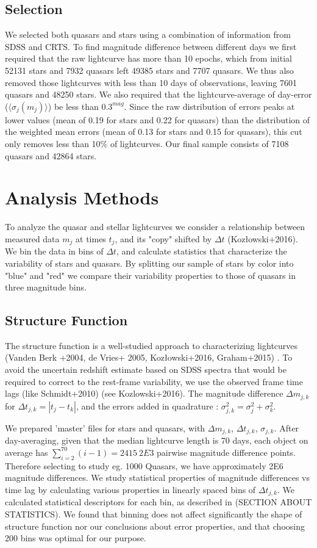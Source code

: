 \documentclass[fleqn,usenatbib]{mnras}  %
\begin{document}
\subsection{Selection}
We selected both quasars and stars using a combination of information from SDSS and CRTS. To find magnitude difference between different days we first required that the raw lightcurve has more than 10 epochs, which from initial 52131 stars and 7932 quasars left 49385 stars and 7707 quasars. We thus also removed those lightcurves with less than 10 days of observations, leaving 7601 quasars and 48250 stars.  We also required that the lightcurve-average of day-error ($\langle \sigma_{j}(m_{j}) \rangle$) be less than $0.3^{mag}$. Since the raw distribution of errors   peaks at lower values (mean of 0.19 for stars and 0.22 for quasars) than the distribution of the weighted mean errors (mean of 0.13 for stars and 0.15 for quasars), this cut only removes less than 10\% of lightcurves. Our final sample consists of 7108 quasars and 42864 stars.

\section{Analysis Methods}
To analyze the quasar and stellar lightcurves we consider a relationship between measured data $m_{j}$  at times $t_{j}$, and its "copy" shifted by $\Delta  t$ (Koz\l{}owski+2016). We bin the data in bins of $\Delta t$, and calculate statistics that characterize  the variability of stars and quasars. By splitting our sample of stars by color into "blue" and "red" we compare their variability properties to those of quasars in three magnitude bins.

\subsection{Structure Function}
The structure function is a well-studied approach to characterizing lightcurves (Vanden Berk +2004,  de Vries+ 2005, Koz\l{}owski+2016, Graham+2015) . To avoid the uncertain redshift estimate based on SDSS spectra that would be required to correct to the rest-frame variability, we use the observed frame time lags (like Schmidt+2010)  (see Kozlowski+2016).  The  magnitude difference $\Delta m_{j,k}$ for $\Delta t_{j,k} = |t_{j} - t_{k}|$, and the errors added in quadrature :  $\sigma_{j,k}^{2} = \sigma_{j}^{2} + \sigma_{k}^{2}$. 


We prepared 'master' files for stars and quasars, with $\Delta m_{j,k}$, $\Delta t_{j,k} $, $\sigma_{j,k}$.  After day-averaging,  given that the median lightcurve length is  70  days,  each object on average has $\sum_{i=2}^{70}{(i-1)} = 2415 ~ 2E3$  pairwise magnitude difference points. Therefore selecting to study eg.  1000 Quasars,  we have approximately 2E6  magnitude differences.    We study statistical properties of magnitude differences vs time lag by calculating various properties in linearly spaced  bins of $\Delta t_{j,k} $.  We calculated statistical descriptors for each bin, as described in (SECTION ABOUT STATISTICS).    We found that  binning does not affect significantly the shape of structure function nor our conclusions about error properties, and that  choosing 200 bins was optimal for our purpose. 
\end{document}
